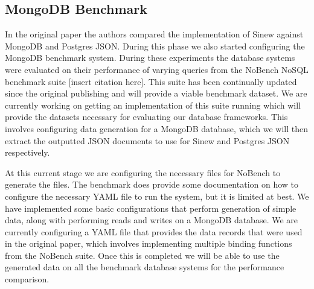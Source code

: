 \documentclass[sigconf]{acmart}
\begin{document}
    \subsection{MongoDB Benchmark}
    In the original paper the authors compared the implementation of Sinew against MongoDB and Postgres JSON. During this phase we also started configuring the MongoDB benchmark system. During these experiments the database systems were evaluated on their performance of varying queries from the NoBench NoSQL benchmark suite [insert citation here]. This suite has been continually updated since the original publishing and will provide a viable benchmark dataset. We are currently working on getting an implementation of this suite running which will provide the datasets necessary for evaluating our database frameworks. This involves configuring data generation for a MongoDB database, which we will then extract the outputted JSON documents to use for Sinew and Postgres JSON respectively.

    At this current stage we are configuring the necessary files for NoBench to generate the files. The benchmark does provide some documentation on how to configure the necessary YAML file to run the system, but it is limited at best. We have implemented some basic configurations that perform generation of simple data, along with performing reads and writes on a MongoDB database. We are currently configuring a YAML file that provides the data records that were used in the original paper, which involves implementing multiple binding functions from the NoBench suite. Once this is completed we will be able to use the generated data on all the benchmark database systems for the performance comparison.



\end{document}
